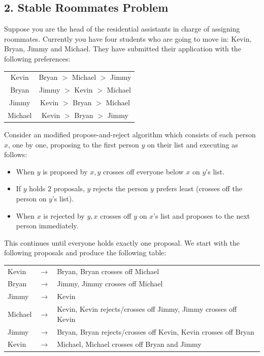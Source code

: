 \documentclass{article}
\begin{document}
\subsection*{2. Stable Roommates Problem}
Suppose you are the head of the residential assistants in charge of assigning roommates. Currently you have four students who are going to move in: Kevin, Bryan, Jimmy and Michael. They have submitted their application with the following preferences:
\begin{center}
\begin{tabular}{ |c|c| } 
\hline
Kevin & Bryan $>$ Michael $>$ Jimmy \\
Bryan & Jimmy $>$ Kevin $>$ Michael \\
Jimmy & Kevin $>$ Bryan $>$ Michael \\
Michael & Kevin $>$ Bryan $>$ Jimmy \\
\hline
\end{tabular}
\end{center}
Consider an modified propose-and-reject algorithm which consists of each person $x$, one by one, proposing to the first person $y$ on their list and executing as follows:
\begin{itemize}
\item When $y$ is proposed by $x, y$ crosses off everyone below $x$ on $y$'s list.
\item If $y$ holds $2$ proposals, $y$ rejects the person $y$ prefers least (crosses off the person on $y$'s list).
\item When $x$ is rejected by $y, x$ crosses off $y$ on $x$'s list and proposes to the next person immediately.
\end{itemize}
This continues until everyone holds exactly one proposal. We start with the following proposals and produce the following table:
\begin{center}
\begin{tabular}{ l l l } 
Kevin & $\to$ & Bryan, Bryan crosses off Michael \\
Bryan & $\to$ & Jimmy, Jimmy crosses off Michael \\
Jimmy & $\to$ & Kevin \\
Michael & $\to$ & Kevin, Kevin rejects/crosses off Jimmy, Jimmy crosses off Kevin \\
Jimmy & $\to$ & Bryan, Bryan rejects/crosses off Kevin, Kevin crosses off Bryan \\
Kevin & $\to$ & Michael, Michael crosses off Bryan and Jimmy \\
\end{tabular} 
\end{center}
\end{document}
